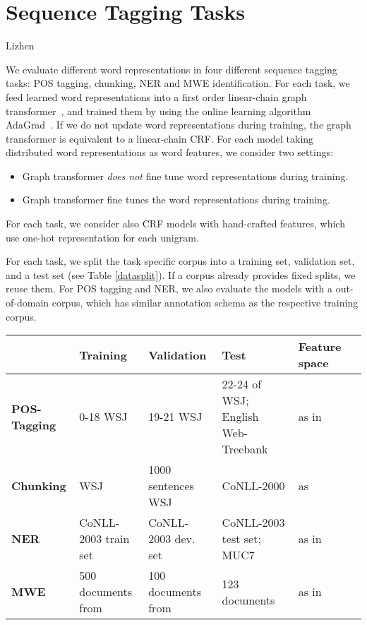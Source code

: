\section{Sequence Tagging Tasks}
\label{sec:SeqTagging}

{\color{red}Lizhen}

We evaluate different word representations in four different sequence tagging tasks: POS tagging, chunking, NER and MWE identification. For each task, we feed learned word representations into a first order linear-chain graph transformer~\cite{collobert2011natural}, and trained them by using the online learning algorithm AdaGrad~\cite{duchi2011adaptive}. If we do not update word representations during training, the graph transformer is equivalent to a linear-chain CRF. For each model taking distributed word representations as word features, we consider two settings: 
\begin{small}
\begin{itemize}
\item[-] Graph transformer \textit{does not} fine tune word representations during training.
\item[-] Graph transformer fine tunes the word representations during training.
\end{itemize}
\end{small}
For each task, we consider also CRF models with hand-crafted features, which use one-hot representation for each unigram.

For each task, we split the task specific corpus into a training set, validation set, and a test set (see Table \ref{datasplit}). If a corpus already provides fixed splits, we reuse them. For POS tagging and NER, we also evaluate the models with a out-of-domain corpus, which has similar annotation schema as the respective training corpus.
\begin{table*}
\begin{small}
\begin{tabular}{lllp{3cm}ll}
\hline
			& \textbf{Training} & \textbf{Validation} & \textbf{Test} & \textbf{Feature space} \\ \hline
\textbf{POS-Tagging} & 0-18 WSJ & 19-21 WSJ & 22-24 of WSJ; English Web-Treebank & as in~\cite{collobert2011natural} \\
\textbf{Chunking} & WSJ & 1000 sentences WSJ & CoNLL-2000 & as~\cite{turian2010word}\\
\textbf{NER} & CoNLL-2003 train set & CoNLL-2003 dev. set & CoNLL-2003 test set; MUC7 & as in~\cite{turian2010word} \\
\textbf{MWE} & 500 documents from & 100 documents from & 123 documents & as in~\cite{mwecorpus}\\
\hline
\end{tabular}
\caption{Datasets and features for each task}
\label{datasplit}
\end{small}
\end{table*}

